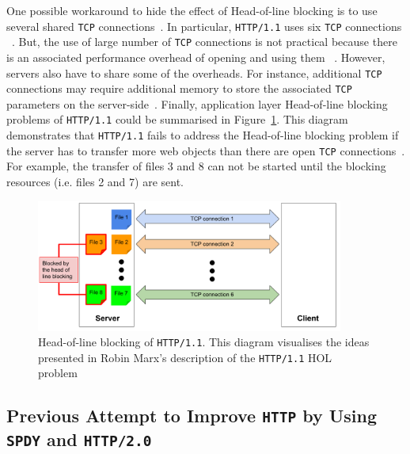 \documentclass[12pt,a4paper,twoside,openright]{report}
\begin{document}
One possible workaround to hide the effect of Head-of-line blocking is to use several shared \texttt{TCP} connections~\cite{bib_digital_ocean_http11_vs_http2}.
In particular, \texttt{HTTP/1.1} uses six \texttt{TCP} connections ~\cite{bib_will-http2-make-my-site-faster, head-of-line-blocking-in-quic-and-http-3-the-details}.
But, the use of large number of \texttt{TCP} connections is not practical because there is an associated performance overhead of opening and using them ~\cite{bib_digital_ocean_http11_vs_http2, head-of-line-blocking-in-quic-and-http-3-the-details}.
However, servers also have to share some of the overheads.
For instance, additional \texttt{TCP} connections may require additional memory to store the associated \texttt{TCP} parameters on the server-side~\cite{head-of-line-blocking-in-quic-and-http-3-the-details}.
Finally, application layer Head-of-line blocking problems of \texttt{HTTP/1.1} could be summarised in Figure~\ref{fig:Head_of_line_blocking_of_HTTP1_1}.
This diagram demonstrates that \texttt{HTTP/1.1} fails to address the Head-of-line blocking problem if the server has to transfer more web objects than there are open \texttt{TCP} connections~\cite{head-of-line-blocking-in-quic-and-http-3-the-details}.
For example, the transfer of files 3 and 8 can not be started until the blocking resources (i.e. files 2 and 7) are sent. 

    \begin{figure}[H]
    \centering
    \includegraphics[width=0.9\textwidth]{figs/Head_of_line_blocking_of_HTTP1_1.png}
    \caption[Head-of-line blocking of \texttt{HTTP/1.1}]{Head-of-line blocking of \texttt{HTTP/1.1}. This diagram visualises the ideas presented in Robin Marx's description of the \texttt{HTTP/1.1} HOL problem~\cite{head-of-line-blocking-in-quic-and-http-3-the-details}}
    \label{fig:Head_of_line_blocking_of_HTTP1_1}
    \end{figure}





\subsection{Previous Attempt to Improve \texttt{HTTP} by Using \texttt{SPDY} and \texttt{HTTP/2.0}} \label{Previous_attempt_to_improve_http_by_using_SPDY_and_HTTP2}
\end{document}
